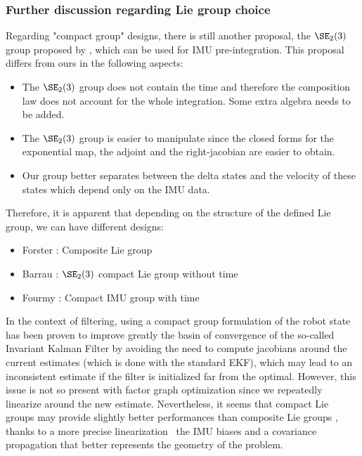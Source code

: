 \subsubsection{Further discussion regarding Lie group choice}

Regarding "compact group" designs, there is still another proposal, the $\SE_2(3)$ group proposed by \cite{barrau2020mathematical, brossard2021associating}, 
which can be used for IMU pre-integration. This proposal differs from ours in the following aspects:

\begin{itemize}
    \item The $\SE_2(3)$ group does not contain the time and therefore the composition law does not account for the whole integration. Some extra algebra needs to be added.
    \item The $\SE_2(3)$ group is easier to manipulate since the closed forms for the exponential map, the adjoint and the right-jacobian are easier to obtain.
    \item Our group better separates between the delta states and the velocity of these states which depend only on the IMU data.
\end{itemize}

Therefore, it is apparent that depending on the structure of the defined Lie group, we can have different designs:
\begin{itemize}
    \item Forster \cite{forster2015imu}: Composite Lie group
    \item Barrau \cite{barrau2020mathematical}: $\SE_2(3)$ compact Lie group without time
    \item Fourmy \cite{fourmy2019absolute}: Compact IMU group with time
\end{itemize}

In the context of filtering, using a compact group formulation of the robot state has been proven to improve greatly the basin of convergence of the so-called
Invariant Kalman Filter \cite{barrau2018invariant, hartley2020contact} by avoiding the need to compute jacobians around the current estimates (which is done
with the standard EKF), which may lead to an inconsistent estimate if the filter is initialized far from the optimal. 
However, this issue is not so present with factor graph optimization since we repeatedly linearize around the new estimate.
Nevertheless, it seems that compact Lie groups may provide slightly better performances than composite Lie groups \cite{brossard2021associating}, thanks 
to a more precise linearization \wrt\ the IMU biases and a covariance propagation that better represents the geometry of the problem.


